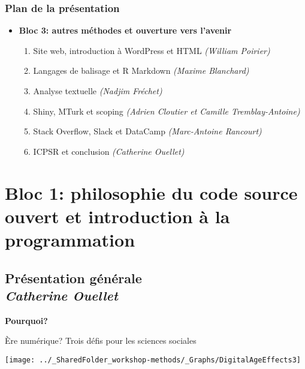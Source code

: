 \documentclass{beamer}
\begin{document}
    \begin{frame}
    \frametitle{Plan de la présentation}
     \begin{itemize}
      \item \textbf{Bloc 3: autres méthodes et ouverture vers l'avenir}
          \begin{enumerate}
            \item Site web, introduction à WordPress et HTML \textit{(William Poirier)}
            \item Langages de balisage et R Markdown \textit{(Maxime Blanchard)}
            \item Analyse textuelle \textit{(Nadjim Fréchet)}
            \item Shiny, MTurk et scoping \textit{(Adrien Cloutier et Camille Tremblay-Antoine)}
            \item Stack Overflow, Slack et DataCamp \textit{(Marc-Antoine Rancourt)}
            \item ICPSR et conclusion \textit{(Catherine Ouellet)}
          \end{enumerate}
      \end{itemize}
    \end{frame}
    
    
  


\section{Bloc 1: philosophie du code source ouvert et introduction à la programmation}
\subsection{Présentation générale \\ \small\emph{Catherine Ouellet}}

\begin{frame}{}
    \vspace{-0.5cm}
    \centering \huge \textbf{Pourquoi?}
\end{frame}

\begin{frame}{Ère numérique? Trois défis pour les sciences sociales}
\vspace{1cm}
    \begin{center}
        \texttt{[image: ../\_SharedFolder\_workshop-methods/\_Graphs/DigitalAgeEffects3]}
    \end{center}
\end{frame}
\end{document}
